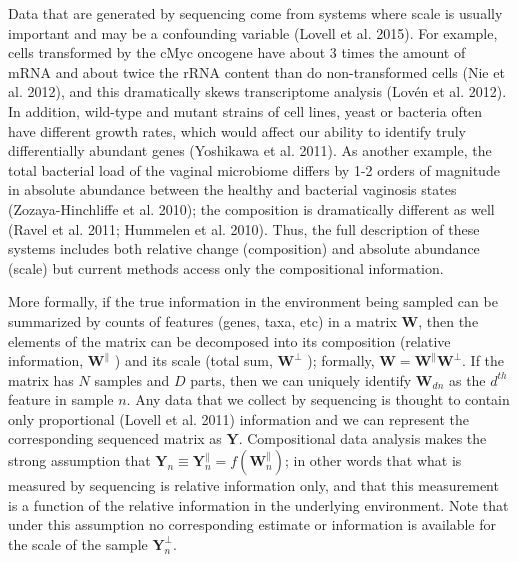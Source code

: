 \documentclass[
]{article}
\begin{document}
Data that are generated by sequencing come from systems where scale is
usually important and may be a confounding variable (Lovell et al.
2015). For example, cells transformed by the cMyc oncogene have about 3
times the amount of mRNA and about twice the rRNA content than do
non-transformed cells (Nie et al. 2012), and this dramatically skews
transcriptome analysis (Lovén et al. 2012). In addition, wild-type and
mutant strains of cell lines, yeast or bacteria often have different
growth rates, which would affect our ability to identify truly
differentially abundant genes (Yoshikawa et al. 2011). As another
example, the total bacterial load of the vaginal microbiome differs by
1-2 orders of magnitude in absolute abundance between the healthy and
bacterial vaginosis states (Zozaya-Hinchliffe et al. 2010); the
composition is dramatically different as well (Ravel et al. 2011;
Hummelen et al. 2010). Thus, the full description of these systems
includes both relative change (composition) and absolute abundance
(scale) but current methods access only the compositional information.

More formally, if the true information in the environment being sampled
can be summarized by counts of features (genes, taxa, etc) in a matrix
\(\mathbf{W}\), then the elements of the matrix can be decomposed into
its composition (relative information, \(\mathbf{W}^{\parallel}\) ) and
its scale (total sum, \(\mathbf{W}^{\perp}\) ); formally,
\(\mathbf{W} = \mathbf{W}^{\parallel} \mathbf{W}^{\perp}\). If the
matrix has \(N\) samples and \(D\) parts, then we can uniquely identify
\(\mathbf{W}_{dn}\) as the \(d^{th}\) feature in sample \(n\). Any data
that we collect by sequencing is thought to contain only proportional
(Lovell et al. 2011) information and we can represent the corresponding
sequenced matrix as \(\mathbf{Y}\). Compositional data analysis makes
the strong assumption that
\(\mathbf{Y}_{n} \equiv \mathbf{Y}^{\parallel}_{n} = f(\mathbf{W}^{\parallel}_{n})\);
in other words that what is measured by sequencing is relative
information only, and that this measurement is a function of the
relative information in the underlying environment. Note that under this
assumption no corresponding estimate or information is available for the
scale of the sample \(\mathbf{Y}^{\perp}_{n}\).
\end{document}
